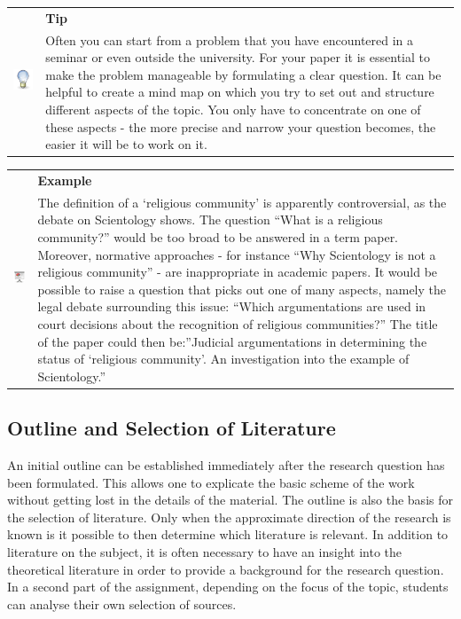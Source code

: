 \documentclass[
  english,
]{scrreprt}
\newlength{\iconwidth}
\newenvironment{displaybox}[2]{%
    \begin{center}
        \setlength\arrayrulewidth{0.75pt}%
        \arrayrulecolor{white}%
        \renewcommand{\arraystretch}{1.3}%
        \begin{tabular}{p{\iconwidth}p{\linewidth-4\tabcolsep-\iconwidth}}
            \multirow{2}{*}{#2}&\cellcolor{boxheadcol}\textbf{\sffamily\color{white}#1} \\%
            \hhline{~-}%
            &\cellcolor{boxcol}%
}{%
            \\
        \end{tabular}
        \arrayrulecolor{black}
    \end{center}
}
\newenvironment{Tip}{%
\begin{displaybox}{Tip}{\includegraphics[width=\iconwidth]{images/icon-tipp}}}%
{\end{displaybox}}
\newenvironment{Example}{%
\begin{displaybox}{Example}{\includegraphics[width=\iconwidth]{images/icon-beispiel}}}%
{\end{displaybox}}
\begin{document}
\begin{Tip}

Often you can start from a problem that you have encountered in a seminar or even outside the university. For your paper it is essential to make the problem manageable by formulating a clear question. It can be helpful to create a mind map on which you try to set out and structure different aspects of the topic. You only have to concentrate on one of these aspects - the more precise and narrow your question becomes, the easier it will be to work on it.

\end{Tip}

\begin{Example}

The definition of a ‘religious community’ is apparently controversial, as the debate on Scientology shows. The question “What is a religious community?” would be too broad to be answered in a term paper. Moreover, normative approaches - for instance “Why Scientology is not a religious community” - are inappropriate in academic papers. It would be possible to raise a question that picks out one of many aspects, namely the legal debate surrounding this issue: “Which argumentations are used in court decisions about the recognition of religious communities?” The title of the paper could then be:”Judicial argumentations in determining the status of ‘religious community’. An investigation into the example of Scientology.”

\end{Example}

\subsection{Outline and Selection of Literature}\label{outline-and-selection-of-literature}

An initial outline can be established immediately after the research question has been formulated. This allows one to explicate the basic scheme of the work without getting lost in the details of the material. The outline is also the basis for the selection of literature. Only when the approximate direction of the research is known is it possible to then determine which literature is relevant. In addition to literature on the subject, it is often necessary to have an insight into the theoretical literature in order to provide a background for the research question. In a second part of the assignment, depending on the focus of the topic, students can analyse their own selection of sources.
\end{document}
